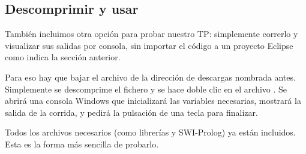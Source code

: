 \subsection{Descomprimir y usar\label{sec:descomprimir_usar}}

También incluimos otra opción para probar nuestro TP: simplemente correrlo y
visualizar sus salidas por consola, sin importar el código a un proyecto
Eclipse como indica la sección anterior.

Para eso hay que bajar el archivo
 de la dirección de descargas
nombrada antes. Simplemente se descomprime el fichero y se hace doble clic en
el archivo . Se abrirá una consola Windows que
inicializará las variables necesarias, mostrará la salida de la corrida, y
pedirá la pulsación de una tecla para finalizar.

Todos los archivos necesarios (como librerías y SWI-Prolog) ya están incluidos.
Esta es la forma más sencilla de probarlo.

